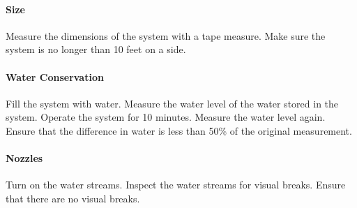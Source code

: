 \paragraph{Size}
Measure the dimensions of the system with a tape measure. Make sure the system is no longer than 10 feet on a side. 

\paragraph{Water Conservation}
Fill the system with water. Measure the water level of the water stored in the system. Operate the system for 10 minutes. Measure the water level again. Ensure that the difference in water is less than 50\% of the original measurement. 


\paragraph{Nozzles}
Turn on the water streams. Inspect the water streams for visual breaks. Ensure that there are no visual breaks.




%
%


